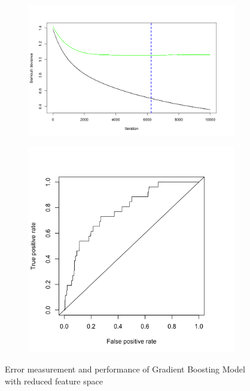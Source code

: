\documentclass[12pt]{article}
\begin{document}
\begin{figure}[h!]
\centering
\begin{subfigure}{.5\textwidth}
  \centering
  \includegraphics[width=0.95\linewidth]{GBSimpleperf.png}
  \label{fig:sub1}
\end{subfigure}%
\begin{subfigure}{.5\textwidth}
  \centering

  \includegraphics[width=0.95\linewidth]{GBSimpleAUC.png}
  \label{fig:sub2}
\end{subfigure}
\label{fig:test}
\caption{Error measurement and performance of Gradient Boosting Model with reduced feature space}
\end{figure}
\end{document}
